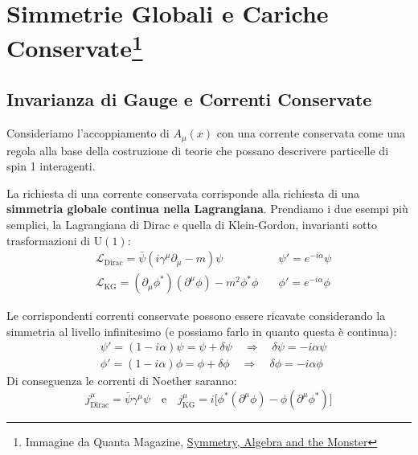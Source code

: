\documentclass[../main.tex]{subfiles}
\begin{document}
\setchapterpreamble[u]{\margintoc}
\chapter[Simmetrie Globali e Cariche Conservate]{Simmetrie Globali e Cariche Conservate\footnote{Immagine da Quanta Magazine, \href{https://www.quantamagazine.org/symmetry-algebra-and-the-monster-20170817/}{Symmetry, Algebra and the Monster}}}
\label{ch:globalsymms}
\fboxsep =1pt %

\section{Invarianza di Gauge e Correnti Conservate}

Consideriamo l'accoppiamento di $A_\mu(x)$ con una corrente conservata come una regola alla base della costruzione di teorie che possano descrivere particelle di spin 1 interagenti.

La richiesta di una corrente conservata corrisponde alla richiesta di una \textbf{simmetria globale continua nella Lagrangiana}. Prendiamo i due esempi più semplici, la Lagrangiana di Dirac e quella di Klein-Gordon, invarianti sotto trasformazioni di $\textrm{U}(1)$:
\begin{align*}
    &\mathscr{L}_\text{Dirac} = \bar\psi(i\gamma^\mu\partial_\mu - m)\psi \quad &\psi'=e^{-i\alpha}\psi\\
    &\mathscr{L}_\text{KG} = (\partial_\mu\phi^\ast)(\partial^\mu\phi)-m^2\phi^\ast\phi \quad &\phi'=e^{-i\alpha}\phi
\end{align*}

Le corrispondenti correnti conservate possono essere ricavate considerando la simmetria al livello infinitesimo (e possiamo farlo in quanto questa è continua):
\begin{align*}
    &\psi'=(1 - i\alpha)\psi = \psi +\delta\psi \quad\Rightarrow\quad \delta\psi = - i\alpha\psi\\
    &\phi'=(1 - i\alpha)\phi = \phi +\delta\phi \quad\Rightarrow\quad \delta\phi = - i\alpha\phi
\end{align*}
Di conseguenza le correnti di Noether saranno:
\begin{equation}
    j^\mu_\text{Dirac} = \bar\psi\gamma^\mu\psi \quad \text{e} \quad j^\mu_\text{KG} = i\big[ \phi^\ast(\partial^\mu\phi) - \phi(\partial^\mu\phi^\ast) \big] 
    \label{eq:kg_dirac_noether_currs}
\end{equation}
\end{document}
